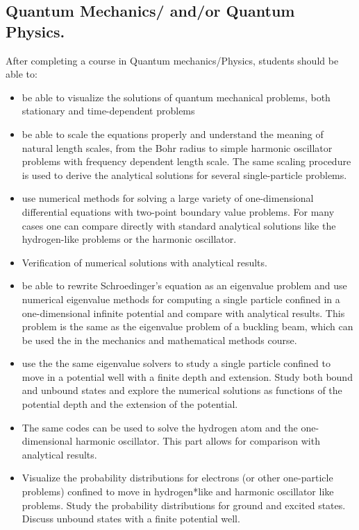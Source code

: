 \documentclass[graybox,envcountchap,sectrefs]{svmult}
\begin{document}
\subsection{Quantum Mechanics/ and/or Quantum Physics.}
After completing a course in Quantum mechanics/Physics, students should be able to:
\begin{itemize}
\item be able to visualize the solutions of quantum mechanical problems, both stationary and time-dependent problems

\item be able to scale the equations properly and understand the meaning of natural length scales, from the Bohr radius to simple harmonic oscillator problems with frequency dependent length scale. The same scaling procedure is  used to derive the analytical solutions for several single-particle problems.

\item use numerical methods for solving a large variety of one-dimensional differential equations with two-point boundary value problems. For many cases one can compare directly with standard analytical  solutions like the hydrogen-like problems or the harmonic oscillator.

\item Verification of numerical solutions with analytical results.

\item be able to rewrite Schroedinger's equation as an eigenvalue problem and use numerical eigenvalue methods for computing a single particle confined in a one-dimensional infinite potential and compare with analytical results. This problem is the same as the eigenvalue problem of a buckling beam, which can be used the in the mechanics and mathematical methods course.

\item use the the same eigenvalue solvers to study a single particle confined to move in a potential well with a finite depth and extension. Study both bound and unbound states and explore the numerical solutions as functions of the potential depth and the extension of the potential.

\item The same codes can be used to solve the hydrogen atom and the one-dimensional harmonic oscillator. This part allows for comparison with analytical results.

\item Visualize the probability distributions for electrons (or other one-particle problems) confined to move in hydrogen*like and harmonic oscillator like problems. Study the probability distributions for ground and excited states. Discuss unbound states with a finite potential well.


\end{itemize}
\end{document}

